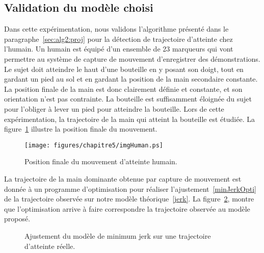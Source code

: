 \subsection{Validation du modèle choisi}
Dans cette expérimentation, nous validons 
l'algorithme présenté dans le paragraphe~\ref{sec:alg2:proj}
pour la détection de trajectoire d'atteinte chez l'humain.
Un humain est équipé d'un ensemble de 23 marqueurs qui 
vont permettre au système de capture de mouvement
d'enregistrer des démonstrations.
Le sujet doit atteindre le haut d'une bouteille en y posant son doigt, 
tout en gardant un pied au sol et en gardant la position de la main secondaire
constante. La position finale de la main
est donc clairement définie et constante, et son orientation
n'est pas contrainte. La bouteille
est suffisamment éloignée du sujet pour l'obliger à lever un
pied pour atteindre la bouteille. Lors de cette expérimentation, la trajectoire de la main
qui atteint la bouteille est étudiée.
La figure~\ref{fig:humanXP} illustre la position finale du mouvement.

\begin{figure}[t]
\begin{center}
\texttt{[image: figures/chapitre5/imgHuman.ps]}
\end{center}
\caption{Position finale du mouvement d'atteinte humain.}
\label{fig:humanXP}
\end{figure}
La trajectoire de la main dominante obtenue par capture de mouvement est donnée
à un programme d'optimisation pour réaliser l'ajustement~\eqref{minJerkOpti} de la trajectoire observée
sur notre modèle théorique~\eqref{jerk}.
La figure~\ref{fig:minJerkFitting1}, montre que l'optimisation arrive 
à faire correspondre la trajectoire observée au modèle proposé.
\begin{figure}[t]
\begin{center}
\resizebox{.4\textwidth}{!} {
      
    }
\end{center}
\caption{Ajustement du modèle de minimum jerk sur une trajectoire d'atteinte réelle.}
\label{fig:minJerkFitting1}
\end{figure}


